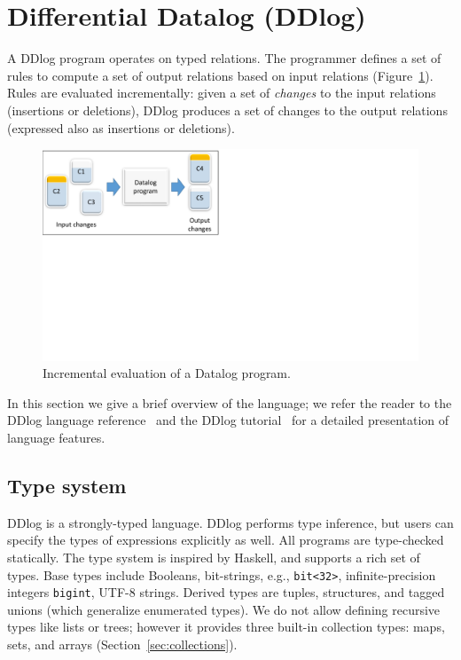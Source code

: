 \section{Differential Datalog (DDlog)}\label{sec-ddlog}

A DDlog program operates on typed relations.  The programmer defines a
set of rules to compute a set of output relations based on input
relations (Figure~\ref{fig:differential}).  Rules are evaluated
incrementally: given a set of \emph{changes} to the input relations
(insertions or deletions), DDlog produces a set of changes to the
output relations (expressed also as insertions or deletions).

\begin{figure}[t]
    \center
    \includegraphics[width=0.5\columnwidth,clip=true,trim=0in 4.4in 6.5in 0in]{differential.pdf}
    \caption{Incremental evaluation of a Datalog program.\label{fig:differential}}
\end{figure}

In this section we give a brief overview of the language; we refer the
reader to the DDlog language reference~\cite{ddlog-manual} and the DDlog
tutorial~\cite{ddlog-tutorial} for a detailed presentation of language
features.

%

\subsection{Type system}

DDlog is a strongly-typed language.  DDlog performs type inference,
but users can specify the types of expressions explicitly as well.
All programs are type-checked statically.  The type system is inspired
by Haskell, and supports a rich set of types.  Base types include
Booleans, bit-strings, e.g., \texttt{bit<32>}, infinite-precision
integers \texttt{bigint}, UTF-8 strings.  Derived types are tuples,
structures, and tagged unions (which generalize enumerated types).  We
do not allow defining recursive types like lists or trees; however
it provides three built-in collection types: maps, sets, and arrays
(Section~\ref{sec:collections}).

